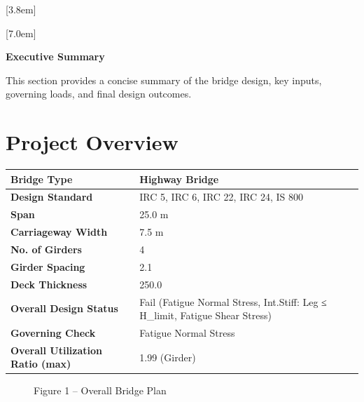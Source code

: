 \documentclass[12pt,a4paper]{report}
\numberwithin{table}{chapter}
\numberwithin{figure}{chapter}
\begin{document}
[3.8em]
  {\normalfont}
  {\contentslabel{2.3em}}
  {\hspace*{-2.3em}}
  {\hfill\contentspage}

[7.0em]
  {\normalfont}
  {\contentslabel{3.2em}}
  {\hspace*{-3.2em}}
  {\hfill\contentspage}

\newpage
\renewcommand{\contentsname}{\centering\Large\bfseries Table of Contents}
\tableofcontents


\newpage
{\centering\Large\bfseries Executive Summary\par}
\vspace{0.8em}

This section provides a concise summary of the bridge design, key inputs, governing loads, and final design outcomes.

\section*{Project Overview}
\label{sec:project-overview}


\begin{tabular}{|L{5.5cm}|L{8.5cm}|}
\hline
\textbf{Bridge Type} & Highway Bridge \\
\hline
\textbf{Design Standard} & IRC 5, IRC 6, IRC 22, IRC 24, IS 800 \\
\hline
\textbf{Span} & 25.0 m \\
\hline
\textbf{Carriageway Width} & 7.5 m \\
\hline
\textbf{No. of Girders} & 4 \\
\hline
\textbf{Girder Spacing} & 2.1 \\
\hline
\textbf{Deck Thickness} & 250.0 \\
\hline
\textbf{Overall Design Status} & Fail (Fatigue Normal Stress, Int.Stiff:\allowbreak{} Leg ≤ H\_\allowbreak{}limit, Fatigue Shear Stress) \\
\hline
\textbf{Governing Check} & Fatigue Normal Stress \\
\hline
\textbf{Overall Utilization Ratio (max)} & 1.99 (Girder) \\
\hline
\end{tabular}


\begin{figure}[H]
\centering
{}
\caption*{Figure 1 -- Overall Bridge Plan}
\end{figure}
\end{document}
